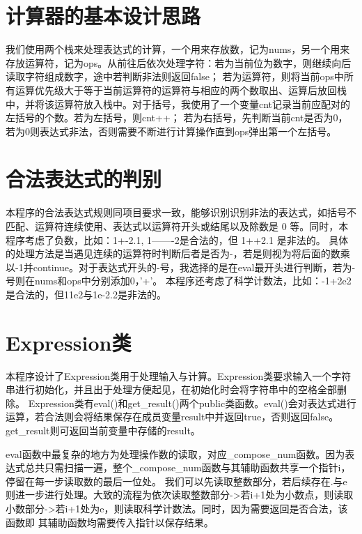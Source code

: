 \documentclass[UTF8]{ctexart}
\begin{document}
\pagestyle{fancy}
\fancyhead{}

\section{计算器的基本设计思路}

\par 我们使用两个栈来处理表达式的计算，一个用来存放数，记为nums，另一个用来存放运算符，记为ops。从前往后依次处理字符：若为当前位为数字，则继续向后读取字符组成数字，途中若判断非法则返回false；
若为运算符，则将当前ops中所有运算优先级大于等于当前运算符的运算符与相应的两个数取出、运算后放回栈中，并将该运算符放入栈中。对于括号，我使用了一个变量cnt记录当前应配对的左括号的个数。若为左括号，则cnt++；
若为右括号，先判断当前cnt是否为0，若为0则表达式非法，否则需要不断进行计算操作直到ops弹出第一个左括号。

\section{合法表达式的判别}

\par 本程序的合法表达式规则同项目要求一致，能够识别识别非法的表达式，如括号不匹配、运算符连续使用、表达式以运算符开头或结尾以及除数是 0 等。同时，本程序考虑了负数，比如：1+-2.1, 1-------2是合法的，但 1++2.1 是非法的。
具体的处理方法是当遇见连续的运算符时判断后者是否为-，若是则视为将后面的数乘以-1并continue。对于表达式开头的-号，我选择的是在eval最开头进行判断，若为-号则在nums和ops中分别添加0，'+'。
本程序还考虑了科学计数法，比如：-1+2e2是合法的，但11e2与1e-2.2是非法的。

\section{Expression类}

\par 本程序设计了Expression类用于处理输入与计算。Expression类要求输入一个字符串进行初始化，并且出于处理方便起见，在初始化时会将字符串中的空格全部删除。
Expression类有eval()和get\_result()两个public类函数。eval()会对表达式进行运算，若合法则会将结果保存在成员变量result中并返回true，否则返回false。
get\_result则可返回当前变量中存储的result。

\par eval函数中最复杂的地方为处理操作数的读取，对应\_compose\_num函数。因为表达式总共只需扫描一遍，整个\_compose\_num函数与其辅助函数共享一个指针i，停留在每一步读取数的最后一位处。
我们可以先读取整数部分，若后续存在.与e则进一步进行处理。大致的流程为依次读取整数部分->若i+1处为小数点，则读取小数部分->若i+1处为e，则读取科学计数法。同时，因为需要返回是否合法，该函数即
其辅助函数均需要传入指针以保存结果。
\end{document}
